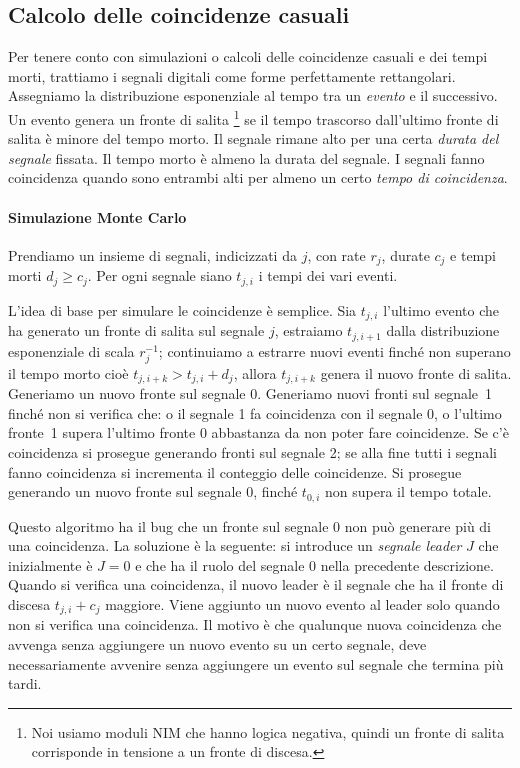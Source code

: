 \subsection{Calcolo delle coincidenze casuali}

Per tenere conto con simulazioni o calcoli delle coincidenze casuali e dei tempi morti,
trattiamo i segnali digitali come forme perfettamente rettangolari.
Assegniamo la distribuzione esponenziale al tempo tra un \emph{evento} e il successivo.
Un evento genera un fronte di salita%
\footnote{Noi usiamo moduli NIM che hanno logica negativa, quindi un fronte di salita corrisponde in tensione a un fronte di discesa.}
se il tempo trascorso dall'ultimo fronte di salita
è minore del tempo morto.
Il segnale rimane alto per una certa \emph{durata del segnale} fissata.
Il tempo morto è almeno la durata del segnale.
I segnali fanno coincidenza quando sono entrambi alti per almeno un certo \emph{tempo di coincidenza}.

\paragraph{Simulazione Monte Carlo}

Prendiamo un insieme di segnali, indicizzati da $j$,
con rate $r_j$, durate $c_j$ e tempi morti $d_j \ge c_j$.
Per ogni segnale siano $t_{j,i}$ i tempi dei vari eventi.

L'idea di base per simulare le coincidenze è semplice.
Sia $t_{j,i}$ l'ultimo evento che ha generato un fronte di salita sul segnale $j$,
estraiamo $t_{j,i+1}$ dalla distribuzione esponenziale di scala $r_j^{-1}$;
continuiamo a estrarre nuovi eventi finché non superano il tempo morto cioè $t_{j,i+k}>t_{j,i} + d_j$,
allora $t_{j,i+k}$ genera il nuovo fronte di salita.
Generiamo un nuovo fronte sul segnale 0.
Generiamo nuovi fronti sul segnale~1 finché non si verifica che:
o il segnale 1 fa coincidenza con il segnale 0,
o l'ultimo fronte~1 supera l'ultimo fronte 0 abbastanza da non poter fare coincidenze.
Se c'è coincidenza si prosegue generando fronti sul segnale 2;
se alla fine tutti i segnali fanno coincidenza si incrementa il conteggio delle coincidenze.
Si prosegue generando un nuovo fronte sul segnale 0,
finché $t_{0,i}$ non supera il tempo totale.

Questo algoritmo ha il bug che un fronte sul segnale 0 non può generare più di una coincidenza.
La soluzione è la seguente:
si introduce un \emph{segnale leader} $J$ che inizialmente è $J=0$
e che ha il ruolo del segnale 0 nella precedente descrizione.
Quando si verifica una coincidenza,
il nuovo leader è il segnale che ha il fronte di discesa $t_{j,i}+c_j$ maggiore.
Viene aggiunto un nuovo evento al leader solo quando non si verifica una coincidenza.
Il motivo è che qualunque nuova coincidenza
che avvenga senza aggiungere un nuovo evento su un certo segnale,
deve necessariamente avvenire senza aggiungere un evento sul segnale che termina più tardi.
